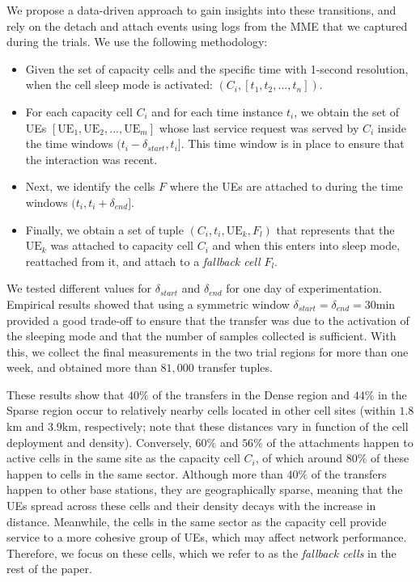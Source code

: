 We propose a data-driven approach to gain insights into these transitions, and rely on the detach and attach events using logs from the MME that we captured during the trials. 
We use the following methodology: 
\begin{itemize}[leftmargin=*]
    \item Given the set of capacity cells and the specific time with 1-second resolution, when the cell sleep mode is activated: ${(C_i, [t_1, t_2, ..., t_n])}$.
    \item For each capacity cell $C_i$ and for each time instance $t_i$, we obtain the set of UEs $[\text{UE}_1, \text{UE}_2, ..., \text{UE}_m]$ whose last service request was served by $C_i$ inside the time windows $(t_i - \delta_{start},  t_i]$. This time window is in place to ensure that the interaction was recent.
    \item Next, we identify the cells $F$ where the UEs are attached to during the time windows $(t_i, t_i + \delta_{end}]$. 
    \item Finally, we obtain a set of tuple ${(C_i, t_i, \text{UE}_k, F_l)}$ that represents that the $\text{UE}_k$ was attached to capacity cell $C_i$ and when this enters into sleep mode, reattached from it, and attach to a \textit{fallback cell} $F_l$.
\end{itemize}
We tested different values for $\delta_{start}$ and $\delta_{end}$ for one day of experimentation. Empirical results showed that using a symmetric window $\delta_{start} = \delta_{end} = 30\text{min}$ provided a good trade-off to ensure that the transfer was due to the activation of the sleeping mode and that the number of samples collected is sufficient.
With this, we collect the final measurements in the two trial regions for more than one week, and obtained more than $81,000$ transfer tuples. 

These results show that $40\%$ of the transfers in the Dense region and $44\%$ in the Sparse region occur to relatively nearby cells located in other cell sites (within $1.8$km and $3.9$km, respectively; note that these distances vary in function of the cell deployment and density).
Conversely, $60\%$ and $56\%$ of the attachments happen to active cells in the same site as the capacity cell $C_i$, of which around $80\%$ of these happen to cells in the same sector. 
Although more than $40\%$ of the transfers happen to other base stations, they are geographically sparse, meaning that the UEs spread across these cells and their density decays with the increase in distance.
Meanwhile, the cells in the same sector as the capacity cell provide service to a more cohesive group of UEs, which may affect network performance. Therefore, we focus on these cells, which we refer to as the \textit{fallback cells} in the rest of the paper.

